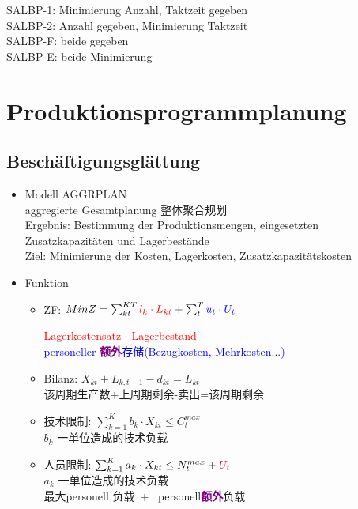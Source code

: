 \documentclass[12pt, letterpaper]{article}
\begin{document}
\begin{CJK*}{UTF8}{gbsn}
\begin{itemize}
SALBP-1: Minimierung Anzahl, Taktzeit gegeben\\[1mm]
SALBP-2: Anzahl gegeben, Minimierung Taktzeit\\[1mm]
SALBP-F: beide gegeben\\[1mm]
SALBP-E: beide Minimierung 
\end{itemize}


\newpage




\newpage
\section{Produktionsprogrammplanung}
\subsection{Beschäftigungsglättung}

\begin{itemize}
\item Modell AGGRPLAN\\
aggregierte Gesamtplanung 整体聚合规划\\
Ergebnis: Bestimmung der Produktionsmengen, eingesetzten Zusatzkapazitäten und Lagerbestände\\
Ziel: Minimierung der Kosten, Lagerkosten, Zusatzkapazitätskosten 


\item Funktion
\begin{itemize}

\item  ZF: $Min Z =   \sum_{kt}^{KT} 
\textcolor{red}{l_k \cdot L_{kt}} +
\sum_{t}^{T} \textcolor{blue}{u_t \cdot U_t}$ 
   

\textcolor{red}{Lagerkostensatz $\cdot$ Lagerbestand}\\
\textcolor{blue}{personeller \textcolor{purple}{\textbf{额外}}存储(Bezugkosten, Mehrkosten...)}

\item Bilanz: $X_{kt} + L_{k,t-1} - d_{kt} = L_{kt}$\\
该周期生产数+上周期剩余-卖出=该周期剩余

\item 技术限制: $\sum_{k=1}^{K}b_k \cdot X_{kt} \leq C^{max}_t$\\
$b_k$ 一单位造成的技术负载

\item 人员限制: $\sum_{k=1}^{K}a_k \cdot X_{kt} \leq N^{max}_t + \textcolor{purple}{U_t}$\\
$a_k$ 一单位造成的技术负载\\
最大personell 负载\ + \ personell\textcolor{purple}{\textbf{额外}}负载


\end{itemize}
\end{itemize}
\end{CJK*}
\end{document}
